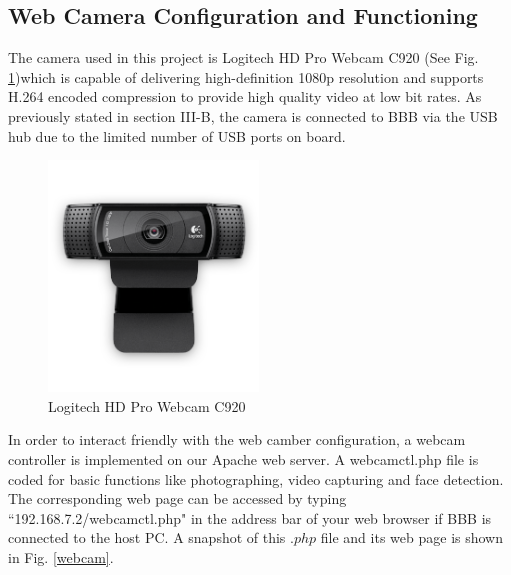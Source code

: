 \documentclass[12pt,journal,draftclsnofoot,onecolumn]{IEEEtran}
\begin{document}
\subsection{Web Camera Configuration and Functioning}\label{Webcam}
The camera used in this project is Logitech HD Pro Webcam C920 \cite{logicam} (See Fig. \ref{logicam})which is  capable of delivering high-definition 1080p resolution and supports H.264 encoded compression to provide high quality video at low bit rates. As previously stated in section III-B, the camera is connected to BBB via the USB hub due to the limited number of USB ports on board.
\begin{figure}[htb]
	\centering
	\includegraphics[width=2.2in]{./figs/webcam4.PNG}
	\caption{Logitech HD Pro Webcam C920}
	\label{logicam}
\end{figure}

In order to interact friendly with the web camber configuration, a webcam controller is implemented on our Apache web server. A webcamctl.php file is coded for basic functions like photographing, video capturing and face detection. The corresponding web page can be accessed by typing ``192.168.7.2/webcamctl.php" in the address bar of your web browser if BBB is connected to the host PC.  A snapshot of this $.php$ file and its web page is shown in Fig. \ref{webcam}.
\end{document}
